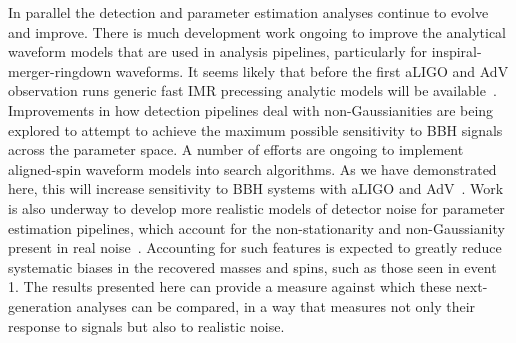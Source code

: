 In parallel the detection and parameter estimation analyses continue to 
evolve and improve. There is much development work ongoing to improve the 
analytical waveform models that are used in analysis pipelines, particularly 
for inspiral-merger-ringdown waveforms. It seems likely that before the 
first aLIGO and AdV observation runs generic fast IMR precessing analytic 
models will be 
available~\cite{Santamaria:2010yb,Taracchini:2012ig,Pan:2013rra,Hannam:2013oca,
Taracchini:2013rva}.
Improvements in how detection pipelines deal with non-Gaussianities are being 
explored to attempt to achieve the maximum possible sensitivity to BBH signals 
across the parameter space. A number of efforts are ongoing to implement 
aligned-spin waveform models into  search algorithms. As we have demonstrated 
here, this will increase sensitivity to BBH systems with aLIGO and 
AdV~\cite{Brown:2012qf,Ajith:2012mn,Harry:2013tca}.
Work is also underway to develop more realistic models 
of detector noise for parameter estimation pipelines, which account for the 
non-stationarity and non-Gaussianity present in real 
noise~\cite{Littenberg:2013gja}.  Accounting for such features
is expected to greatly reduce systematic biases in the recovered masses and 
spins, such as those seen in event 1.
The results presented here can provide a measure against which these
next-generation analyses can be compared, in a way that measures not only their
response to signals but also to realistic noise.

